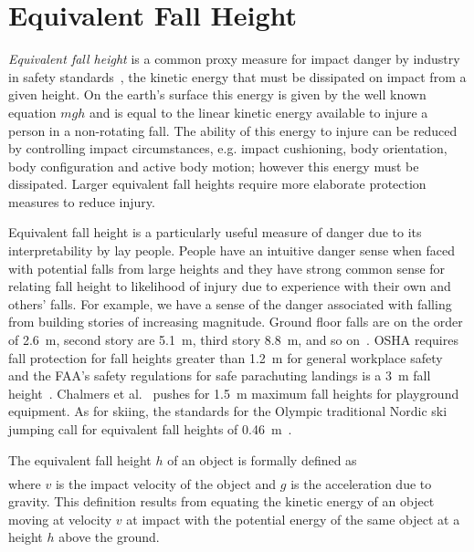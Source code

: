\documentclass{article}
\begin{document}
\section{Equivalent Fall Height}
%
\emph{Equivalent fall height} is a common proxy measure for impact
danger by industry in safety standards~\cite{Hubbard2012}, the
kinetic energy that must be dissipated on impact from a given height. On the
earth's surface this energy is given by the well known equation $mgh$ and is
equal to the linear kinetic energy available to injure a person in a non-rotating fall. The ability of
this energy to injure can be reduced by controlling impact circumstances,
e.g. impact cushioning, body orientation, body configuration and active body
motion; however this energy must be dissipated. Larger equivalent fall
heights require more elaborate protection measures to reduce injury.

Equivalent fall height is a particularly useful measure of danger due to its
interpretability by lay people. People have an intuitive danger sense when faced
with potential falls from large heights and they have strong common sense for
relating fall height to likelihood of injury due to experience with their own 
and others' falls. For example, we have a sense of the danger
associated with falling from building stories of increasing magnitude. Ground
floor falls are on the order of 2.6~\si{\meter}, second story are
5.1~\si{\meter}, third story 8.8~\si{\meter}, and so on~\cite{Vish2005}. OSHA
requires fall protection for fall heights greater than 1.2~\si{\meter} for
general workplace safety~ and the FAA's safety regulations
for safe parachuting landings is a 3~\si{\meter} fall height~.  Chalmers et al.~\cite{Chalmers1996} pushes for 1.5~\si{\meter}
maximum fall heights for playground equipment. As for skiing, the standards for
the Olympic traditional Nordic ski jumping call for equivalent fall heights of
0.46~\si{\meter}~.

The equivalent fall height $h$ of an object is formally defined as
%
\begin{align}
  
  \label{eq:efh_general}
\end{align}
%
where $v$ is the impact velocity of the object and $g$ is the acceleration due
to gravity. This definition results from equating the kinetic energy of an
object moving at velocity $v$ at impact with the potential energy of the same
object at a height $h$ above the ground.
\end{document}
